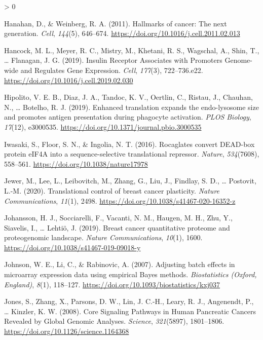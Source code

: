 \documentclass[
  12pt,
  openany]{book}
\newlength{\cslhangindent}
\newenvironment{CSLReferences}[2] %
 {%
  \setlength{\parindent}{0pt}
  \ifodd #1 \everypar{\setlength{\hangindent}{\cslhangindent}}\ignorespaces\fi
  \ifnum #2 > 0
  \setlength{\parskip}{#2\baselineskip}
  \fi
 }%
 {}
\begin{document}
\begin{CSLReferences}{1}{0}
\leavevmode\hypertarget{ref-Hanahan2011}{}%
Hanahan, D., \& Weinberg, R. A. (2011). Hallmarks of cancer: {The} next generation. \emph{Cell}, \emph{144}(5), 646--674. \url{https://doi.org/10.1016/j.cell.2011.02.013}

\leavevmode\hypertarget{ref-Hancock2019}{}%
Hancock, M. L., Meyer, R. C., Mistry, M., Khetani, R. S., Wagschal, A., Shin, T., \ldots{} Flanagan, J. G. (2019). Insulin {Receptor Associates} with {Promoters Genome}-wide and {Regulates Gene Expression}. \emph{Cell}, \emph{177}(3), 722--736.e22. \url{https://doi.org/10.1016/j.cell.2019.02.030}

\leavevmode\hypertarget{ref-Hipolito2019}{}%
Hipolito, V. E. B., Diaz, J. A., Tandoc, K. V., Oertlin, C., Ristau, J., Chauhan, N., \ldots{} Botelho, R. J. (2019). Enhanced translation expands the endo-lysosome size and promotes antigen presentation during phagocyte activation. \emph{PLOS Biology}, \emph{17}(12), e3000535. \url{https://doi.org/10.1371/journal.pbio.3000535}

\leavevmode\hypertarget{ref-Iwasaki2016}{}%
Iwasaki, S., Floor, S. N., \& Ingolia, N. T. (2016). Rocaglates convert {DEAD}-box protein {eIF4A} into a sequence-selective translational repressor. \emph{Nature}, \emph{534}(7608), 558--561. \url{https://doi.org/10.1038/nature17978}

\leavevmode\hypertarget{ref-Jewer2020b}{}%
Jewer, M., Lee, L., Leibovitch, M., Zhang, G., Liu, J., Findlay, S. D., \ldots{} Postovit, L.-M. (2020). Translational control of breast cancer plasticity. \emph{Nature Communications}, \emph{11}(1), 2498. \url{https://doi.org/10.1038/s41467-020-16352-z}

\leavevmode\hypertarget{ref-Johansson2019}{}%
Johansson, H. J., Socciarelli, F., Vacanti, N. M., Haugen, M. H., Zhu, Y., Siavelis, I., \ldots{} Lehtiö, J. (2019). Breast cancer quantitative proteome and proteogenomic landscape. \emph{Nature Communications}, \emph{10}(1), 1600. \url{https://doi.org/10.1038/s41467-019-09018-y}

\leavevmode\hypertarget{ref-Johnson2007}{}%
Johnson, W. E., Li, C., \& Rabinovic, A. (2007). Adjusting batch effects in microarray expression data using empirical {Bayes} methods. \emph{Biostatistics (Oxford, England)}, \emph{8}(1), 118--127. \url{https://doi.org/10.1093/biostatistics/kxj037}

\leavevmode\hypertarget{ref-Jones2008}{}%
Jones, S., Zhang, X., Parsons, D. W., Lin, J. C.-H., Leary, R. J., Angenendt, P., \ldots{} Kinzler, K. W. (2008). Core {Signaling Pathways} in {Human Pancreatic Cancers Revealed} by {Global Genomic Analyses}. \emph{Science}, \emph{321}(5897), 1801--1806. \url{https://doi.org/10.1126/science.1164368}


\end{CSLReferences}
\end{document}
